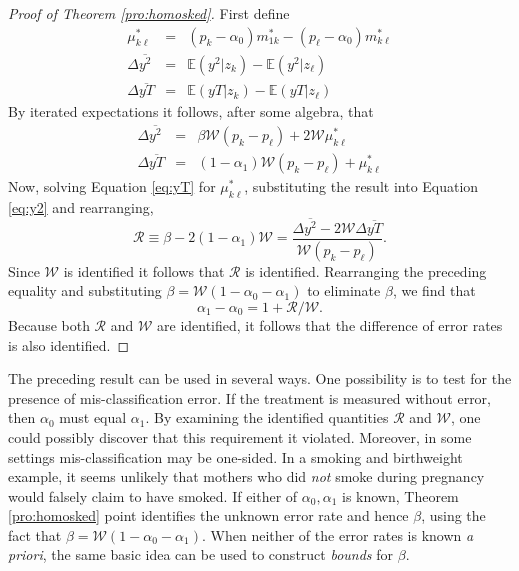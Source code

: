 \begin{proof}[Proof of Theorem \ref{pro:homosked}]
  First define
  \begin{eqnarray}
    \label{eq:mustar}
    \mu_{k\ell}^* &=&  (p_k - \alpha_0) m_{1k}^* - (p_{\ell}-\alpha_0)m_{k\ell}^* \\
    \label{eq:y2def}
    \Delta\overline{y^2} &=&  \mathbb{E}(y^2|z_k) - \mathbb{E}(y^2|z_\ell)\\
    \label{eq:yTdef}
    \Delta\overline{yT} &=&  \mathbb{E}(yT|z_k) - \mathbb{E}(yT|z_\ell)
  \end{eqnarray}
  By iterated expectations it follows, after some algebra, that
  \begin{eqnarray}
    \label{eq:y2}
    \Delta\overline{y^2} &=& \beta \mathcal{W} (p_k - p_\ell)  + 2 \mathcal{W} \mu_{k\ell}^* \\
    \label{eq:yT}
    \Delta\overline{yT} &=& (1-\alpha_1)\mathcal{W}(p_k - p_\ell) + \mu_{k\ell}^* 
  \end{eqnarray}
  Now, solving Equation \ref{eq:yT} for $\mu_{k\ell}^*$, substituting the result into Equation \ref{eq:y2} and rearranging,
  \begin{equation}
    \mathcal{R} \equiv \beta - 2(1-\alpha_1)\mathcal{W} = \frac{\Delta\overline{y^2} - 2 \mathcal{W}\Delta\overline{yT}}{\mathcal{W}(p_k - p_\ell)}.
    \label{eq:Rdef}
  \end{equation}
  Since $\mathcal{W}$ is identified it follows that $\mathcal{R}$ is identified.
  Rearranging the preceding equality and substituting $\beta=\mathcal{W}(1-\alpha_0 -\alpha_1)$ to eliminate $\beta$, we find that
  \begin{equation}
    \alpha_1 - \alpha_0 = 1 + \mathcal{R}/\mathcal{W}.
   \label{eq:aDiff}
  \end{equation}
  Because both $\mathcal{R}$ and $\mathcal{W}$ are identified, it follows that the difference of error rates is also identified.
\end{proof}

The preceding result can be used in several ways.
One possibility is to test for the presence of mis-classification error.
If the treatment is measured without error, then $\alpha_0$ must equal $\alpha_1$.
By examining the identified quantities $\mathcal{R}$ and $\mathcal{W}$, one could possibly discover that this requirement it violated.
Moreover, in some settings mis-classification may be one-sided.
In a smoking and birthweight example, it seems unlikely that mothers who did \emph{not} smoke during pregnancy would falsely claim to have smoked.
If either of $\alpha_0, \alpha_1$ is known, Theorem \ref{pro:homosked} point identifies the unknown error rate and hence $\beta$, using the fact that $\beta=\mathcal{W}(1-\alpha_0-\alpha_1)$.
When neither of the error rates is known \emph{a priori}, the same basic idea can be used to construct \emph{bounds} for $\beta$.

